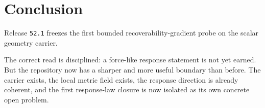 \documentclass[11pt]{article}
\begin{document}
\section{Conclusion}

Release \texttt{52.1} freezes the first bounded recoverability-gradient probe on the scalar geometry carrier.

The correct read is disciplined: a force-like response statement is not yet earned. But the repository now has a sharper and more useful boundary than before. The carrier exists, the local metric field exists, the response direction is already coherent, and the first response-law closure is now isolated as its own concrete open problem.
\end{document}
